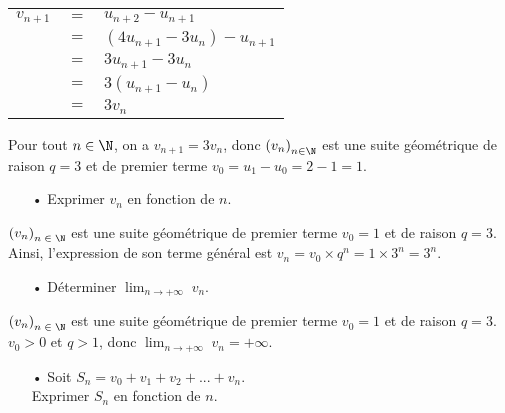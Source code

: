 \vspace*{.3cm}

\begin{tabular}{lll}
$v_{n+1}$ & $=$ & $u_{n+2} - u_{n+1}$ \\
& $=$ & $\left(4u_{n+1} - 3u_n\right) - u_{n+1}$ \\
& $=$ & $3u_{n+1} - 3u_n$ \\
& $=$ & $3\left(u_{n+1} - u_n\right)$ \\
& $=$ & $3v_n$ \\
\end{tabular}

\vspace*{.3cm}

Pour tout $n \in \N$, on a $v_{n+1} = 3v_n$, donc $\left(v_n\right)_{n \in \N}$ est une suite géométrique de raison $q = 3$ et de premier terme $v_0 = u_1 - u_0 = 2 - 1 = 1$. \\

\begin{itemize}
\item[•] Exprimer $v_n$ en fonction de $n$. \\
\end{itemize}

$\left(v_n\right)_{n \; \in \; \N}$ est une suite géométrique de premier terme $v_0 = 1$ et de raison $q = 3$. \\

Ainsi, l'expression de son terme général est $v_n = v_0 \times q^n = 1 \times 3^n = 3^n$. \\

\begin{itemize}
\item[•] Déterminer $ \displaystyle {\lim_{n \rightarrow +\infty}} \; v_n$. \\
\end{itemize}

$\left(v_n\right)_{n \; \in \; \N}$ est une suite géométrique de premier terme $v_0 = 1$ et de raison $q = 3$. \\

$v_0 > 0$ et $q > 1$, donc $ \displaystyle {\lim_{n \rightarrow +\infty}} \; v_n = +\infty$. 

\newpage

\begin{itemize}
\item[•] Soit $S_n = v_0 + v_1 + v_2 + ... + v_n$. \\ Exprimer $S_n$ en fonction de $n$. \\
\end{itemize}

